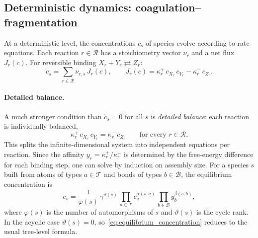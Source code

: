 \documentclass[11pt]{amsart}
\newcommand{\Reactions}{\mathcal{R}}
\newcommand{\Bonds}{\mathcal{B}}
\newcommand{\Atoms}{\mathcal{T}}
\theoremstyle{definition}
\theoremstyle{plain}
\theoremstyle{remark}
\begin{document}
\subsection{Deterministic dynamics: coagulation--fragmentation}
\label{sec:deterministic}

At a deterministic level, the concentrations $c_s$ of species evolve according to rate equations.
Each reaction $r\in\Reactions$ has a stoichiometry vector $\nu_r$ and a net flux $J_r(c)$.
For reversible binding $X_r + Y_r \rightleftarrows Z_r$:
\begin{equation}\label{eq:coag_frag}
\dot{c}_s = \sum_{r\in\Reactions} \nu_{r,s}\,J_r(c),
\qquad J_r(c) = \kappa_r^+\,c_{X_r}\,c_{Y_r} - \kappa_r^-\,c_{Z_r}.
\end{equation}

\paragraph{Detailed balance.}
A much stronger condition than $\dot{c}_s=0$ for all $s$ is \emph{detailed balance}: each reaction is individually balanced,
\begin{equation}\label{eq:detailed_balance}
\kappa_r^+\,c_{X_r}\,c_{Y_r} = \kappa_r^-\,c_{Z_r}
\qquad\text{for every } r\in\Reactions.
\end{equation}
This splits the infinite-dimensional system into independent equations per reaction.
Since the affinity $y_r = \kappa_r^+/\kappa_r^-$ is determined by the free-energy difference for each binding step, one can solve by induction on assembly size.
For a species $s$ built from atoms of types $a\in\Atoms$ and bonds of types $b\in\Bonds$, the equilibrium concentration is
\begin{equation}\label{eq:equilibrium_concentration}
c_s = \frac{1}{\varphi(s)}\,
\gamma^{\vartheta(s)}\,
\prod_{a\in\Atoms} c_a^{\alpha(s,a)}\,
\prod_{b\in\Bonds} y_b^{\beta(s,b)},
\end{equation}
where $\varphi(s)$ is the number of automorphisms of $s$ and $\vartheta(s)$ is the cycle rank.
In the acyclic case $\vartheta(s)=0$, so~\eqref{eq:equilibrium_concentration} reduces to the usual tree-level formula.
\end{document}
